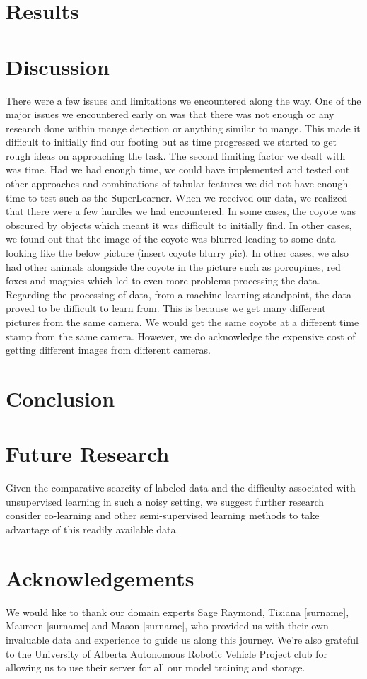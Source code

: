 \documentclass{article}
\begin{document}
\section{Results}

\section{Discussion}
There were a few issues and limitations we encountered along the way. One of the major issues we encountered early on was that there was not enough or any research done within mange detection or anything similar to mange. This made it difficult to initially find our footing but as time progressed we started to get rough ideas on approaching the task. The second limiting factor we dealt with was time. Had we had enough time, we could have implemented and tested out other approaches and combinations of tabular features we did not have enough time to test such as the SuperLearner. When we received our data, we realized that there were a few hurdles we had encountered. In some cases, the coyote was obscured by objects which meant it was difficult to initially find. In other cases, we found out that the image of the coyote was blurred leading to some data looking like the below picture (insert coyote blurry pic). In other cases, we also had other animals alongside the coyote in the picture such as porcupines, red foxes and magpies which led to even more problems processing the data. Regarding the processing of data, from a machine learning standpoint, the data proved to be difficult to learn from. This is because we get many different pictures from the same camera. We would get the same coyote at a different time stamp from the same camera. However, we do acknowledge the expensive cost of getting different images from different cameras.

\section{Conclusion}

\section{Future Research}
Given the comparative scarcity of labeled data and the difficulty associated with unsupervised learning in such a noisy setting, we suggest further research consider co-learning and other semi-supervised learning methods to take advantage of this readily available data.

\section{Acknowledgements}
We would like to thank our domain experts Sage Raymond, Tiziana [surname], Maureen [surname] and Mason [surname], who provided us with their own invaluable data and experience to guide us along this journey. We’re also grateful to the University of Alberta Autonomous Robotic Vehicle Project club for allowing us to use their server for all our model training and storage.
\clearpage


\end{document}
